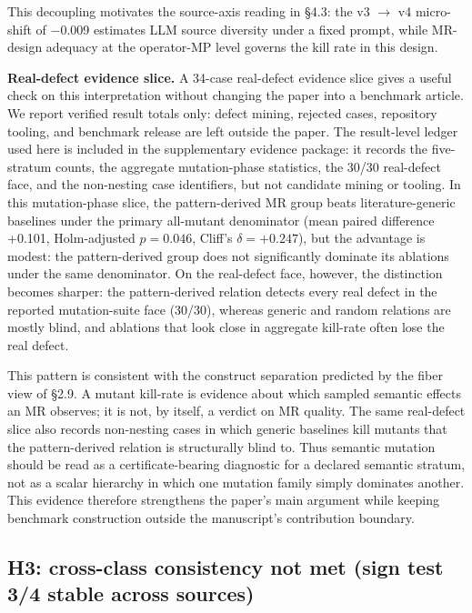 \documentclass[manuscript,screen,review]{acmart}
\begin{document}
This decoupling motivates the source-axis reading in §4.3: the v3 $\to$
v4 micro-shift of $-$0.009 estimates LLM source diversity under a fixed
prompt, while MR-design adequacy at the operator-MP level governs the
kill rate in this design.

\textbf{Real-defect evidence slice.} A 34-case real-defect evidence
slice gives a useful check on this interpretation without changing the
paper into a benchmark article. We report verified result totals only:
defect mining, rejected cases, repository tooling, and benchmark release
are left outside the paper. The result-level ledger used here is included
in the supplementary evidence package: it records the five-stratum counts,
the aggregate mutation-phase statistics, the 30/30 real-defect face, and
the non-nesting case identifiers, but not candidate mining or tooling. In
this mutation-phase slice, the
pattern-derived MR group beats
literature-generic baselines under the primary all-mutant denominator
(mean paired difference +0.101, Holm-adjusted \(p=0.046\), Cliff's
\(\delta=+0.247\)), but the advantage is modest: the pattern-derived
group does not significantly dominate its ablations under the same
denominator. On the real-defect face, however, the distinction becomes
sharper: the pattern-derived relation detects every real defect in the
reported mutation-suite face (30/30), whereas generic and random
relations are mostly blind, and ablations that look close in aggregate
kill-rate often lose the real defect.

This pattern is consistent with the construct separation predicted by the
fiber view of §2.9. A mutant kill-rate is evidence about which sampled
semantic effects an MR observes; it is not, by itself, a verdict on MR
quality. The same real-defect slice also records non-nesting cases in
which generic baselines kill mutants that the pattern-derived relation is
structurally blind to.
Thus semantic mutation should be read as a certificate-bearing diagnostic
for a declared semantic stratum, not as a scalar hierarchy in which one
mutation family simply dominates another. This evidence therefore
strengthens the paper's main argument while keeping benchmark construction
outside the manuscript's contribution boundary.

\subsection{H3: cross-class consistency not met (sign test 3/4 stable across sources)}\label{h4-partial-across-same-source-and-cross-source}
\end{document}
